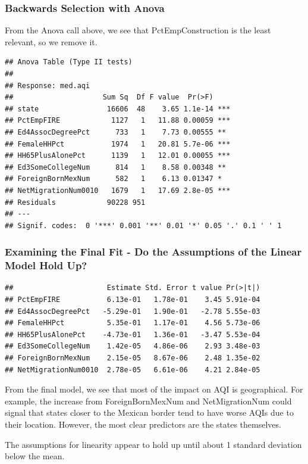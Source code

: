 \documentclass[
  ignorenonframetext,
]{beamer}
\begin{document}
\begin{frame}[fragile]
\frametitle{Backwards Selection with Anova}

From the Anova call above, we see that PctEmpConstruction is the least
relevant, so we remove it.

\tiny

\begin{verbatim}
## Anova Table (Type II tests)
## 
## Response: med.aqi
##                     Sum Sq  Df F value  Pr(>F)    
## state                16606  48    3.65 1.1e-14 ***
## PctEmpFIRE            1127   1   11.88 0.00059 ***
## Ed4AssocDegreePct      733   1    7.73 0.00555 ** 
## FemaleHHPct           1974   1   20.81 5.7e-06 ***
## HH65PlusAlonePct      1139   1   12.01 0.00055 ***
## Ed3SomeCollegeNum      814   1    8.58 0.00348 ** 
## ForeignBornMexNum      582   1    6.13 0.01347 *  
## NetMigrationNum0010   1679   1   17.69 2.8e-05 ***
## Residuals            90228 951                    
## ---
## Signif. codes:  0 '***' 0.001 '**' 0.01 '*' 0.05 '.' 0.1 ' ' 1
\end{verbatim}
\end{frame}

\begin{frame}[fragile]
\frametitle{Examining the Final Fit - Do the Assumptions of the Linear Model Hold Up?}

\tiny

\begin{verbatim}
##                      Estimate Std. Error t value Pr(>|t|)
## PctEmpFIRE           6.13e-01   1.78e-01    3.45 5.91e-04
## Ed4AssocDegreePct   -5.29e-01   1.90e-01   -2.78 5.55e-03
## FemaleHHPct          5.35e-01   1.17e-01    4.56 5.73e-06
## HH65PlusAlonePct    -4.73e-01   1.36e-01   -3.47 5.53e-04
## Ed3SomeCollegeNum    1.42e-05   4.86e-06    2.93 3.48e-03
## ForeignBornMexNum    2.15e-05   8.67e-06    2.48 1.35e-02
## NetMigrationNum0010  2.78e-05   6.61e-06    4.21 2.84e-05
\end{verbatim}

From the final model, we see that most of the impact on AQI is
geographical. For example, the increase from ForeignBornMexNum and
NetMigrationNum could signal that states closer to the Mexican border
tend to have worse AQIs due to their location. However, the most clear
predictors are the states themselves.

The assumptions for linearity appear to hold up until about 1 standard
deviation below the mean.
\end{frame}
\end{document}
